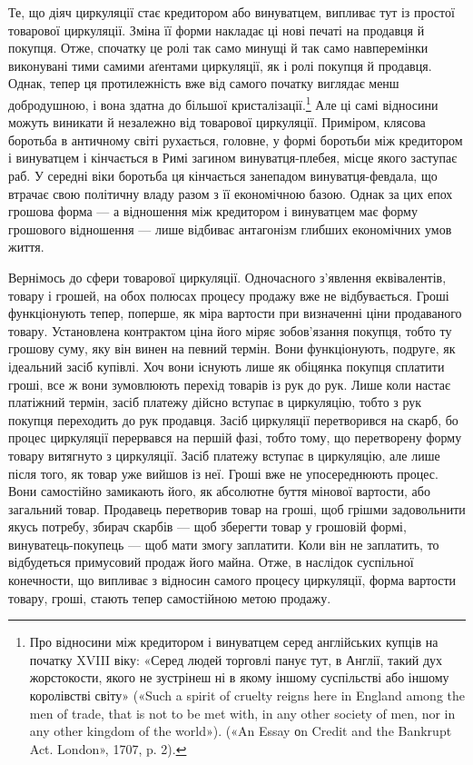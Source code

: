 Те, що діяч циркуляції стає кредитором або винуватцем, випливає тут із простої товарової циркуляції.
Зміна її форми накладає ці нові печаті на продавця й покупця. Отже, спочатку це ролі так само минущі
й так само навперемінки виконувані тими самими аґентами циркуляції, як і ролі покупця й продавця.
Однак, тепер ця
протилежність вже від самого початку виглядає менш добродушною, і вона здатна до більшої
кристалізації.\footnote{
Про відносини між кредитором і винуватцем серед англійських
купців на початку XVIII віку: «Серед людей торговлі панує тут, в Англії,
такий дух жорстокости, якого не зустрінеш ні в якому іншому суспільстві
або іншому королівстві світу» («Such a spirit of cruelty reigns here
in England among the men of trade, that is not to be met with, in any other
society of men, nor in any other kingdom of the world»). («An Essay оn Credit and the Bankrupt Act.
London», 1707, p. 2).
} Але ці самі відносини можуть виникати й незалежно від товарової циркуляції.
Приміром, клясова боротьба в античному світі рухається, головне, у формі боротьби між кредитором і
винуватцем і кінчається в
Римі загином винуватця-плебея, місце якого заступає раб. У середні віки боротьба ця кінчається
занепадом винуватця-февдала, що втрачає свою політичну владу разом з її економічною базою. Однак за
цих епох грошова форма — а відношення між
кредитором і винуватцем має форму грошового відношення — лише
відбиває антагонізм глибших економічних умов життя.

Вернімось до сфери товарової циркуляції. Одночасного з’явлення еквівалентів, товару і грошей, на
обох полюсах процесу продажу вже не відбувається. Гроші функціонують тепер, поперше, як міра
вартости при визначенні ціни продаваного товару. Установлена контрактом ціна його міряє зобов’язання
покупця, тобто ту грошову суму, яку він винен на певний термін. Вони функціонують, подруге, як
ідеальний засіб купівлі. Хоч вони існують лише як обіцянка покупця сплатити гроші, все ж вони
зумовлюють перехід товарів із рук до рук. Лише коли настає платіжний термін, засіб платежу дійсно
вступає в циркуляцію, тобто з рук покупця переходить до рук продавця. Засіб циркуляції
перетворився на скарб, бо процес циркуляції перервався на першій фазі, тобто тому, що
перетворену форму товару витягнуто з циркуляції. Засіб платежу вступає в циркуляцію, але лише після
того, як товар уже вийшов із неї. Гроші вже не упосереднюють процес. Вони самостійно замикають його,
як абсолютне буття мінової вартости, або загальний товар. Продавець перетворив товар на гроші, щоб
грішми задовольнити якусь потребу, збирач скарбів — щоб зберегти товар у грошовій
формі, винуватець-покупець — щоб мати змогу заплатити. Коли він не заплатить, то відбудеться
примусовий продаж його майна. Отже, в наслідок суспільної конечности, що випливає з відносин самого
процесу циркуляції, форма вартости товару, гроші, стають тепер самостійною метою продажу.

